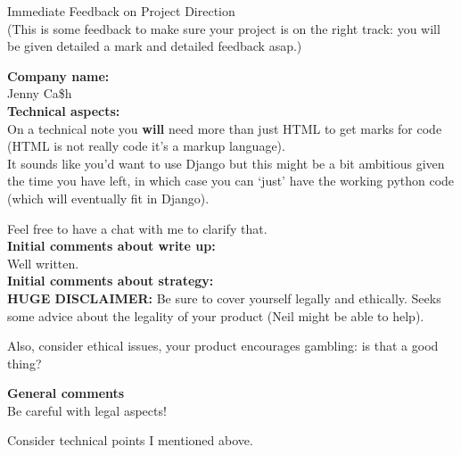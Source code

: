 \documentclass{article}
\begin{document}
\begin{center}
\Huge{Immediate Feedback on Project Direction}\\
\tiny{(This is some feedback to make sure your project is on the right track: you will be given detailed a mark and detailed feedback asap.)}
\end{center}


\normalsize
\textbf{Company name:}\\

Jenny Ca\$h \\

\textbf{Technical aspects:}\\

On a technical note you \textbf{will} need more than just HTML to get marks for code (HTML is not really code it's a markup language).\\

It sounds like you'd want to use Django but this might be a bit ambitious given the time you have left, in which case you can `just' have the working python code (which will eventually fit in Django).

Feel free to have a chat with me to clarify that.\\

\textbf{Initial comments about write up:}\\

Well written.\\

\textbf{Initial comments about strategy:}\\

\textbf{HUGE DISCLAIMER:} Be sure to cover yourself legally and ethically. Seeks some advice about the legality of your product (Neil might be able to help).

Also, consider ethical issues, your product encourages gambling: is that a good thing?

\textbf{General comments}\\

Be careful with legal aspects!

Consider technical points I mentioned above.
\end{document}
